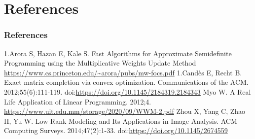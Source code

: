 \documentclass[
	11pt, %
]{beamer}
\begin{document}



\section{References}


\begin{frame} %
	\frametitle{References}
	
	\begin{thebibliography}{12} %
		\footnotesize %
 1.Arora S, Hazan E, Kale S. Fast Algorithms for Approximate Semidefinite Programming using the Multiplicative Weights Update Method \url{https://www.cs.princeton.edu/~arora/pubs/mw-focs.pdf}
 1.Candès E, Recht B. Exact matrix completion via convex optimization. Communications of the ACM. 2012;55(6):111-119. doi:\url{https://doi.org/10.1145/2184319.2184343}
 Myo W. A Real Life Application of Linear Programming. 2012;4. \url{https://www.uit.edu.mm/storage/2020/09/WWM-2.pdf}
 Zhou X, Yang C, Zhao H, Yu W. Low-Rank Modeling and Its Applications in Image Analysis. ACM Computing Surveys. 2014;47(2):1-33. doi:\url{https://doi.org/10.1145/2674559}
‌
	\end{thebibliography}
\end{frame}
\end{document}

